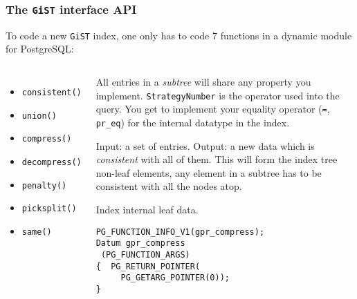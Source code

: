 \documentclass{beamer}
\begin{document}
\begin{frame}[fragile]
  \frametitle{The \texttt{GiST} interface API}

  To code a new \texttt{GiST} index, one only has to code 7 functions in a
  dynamic module for PostgreSQL:

\begin{columns}[c]

  \begin{itemize}
   \item<1,2,6-> \texttt{consistent()}
   \item<1,3,6-> \texttt{union()}
   \item<1,4,6-> \texttt{compress()}
   \item<1,4,6-> \texttt{decompress()}
   \item<1,5,6-> \texttt{penalty()}
   \item<1,5,6-> \texttt{picksplit()}
   \item<1,2,6-> \texttt{same()}
  \end{itemize}


  \begin{overprint}


  All entries in a \textit{subtree} will share any property you
  implement.
  \linebreak
  \texttt{StrategyNumber} is the operator used into the query.
  \linebreak
  \linebreak
  You get to implement your equality operator (\texttt{=},
  \texttt{pr\_eq}) for the internal datatype in the index.


  Input: a set of entries. 
  \linebreak
  \linebreak
  Output: a new data which is \textit{consistent} with all of them.
  \linebreak
  \linebreak
  This will form the index tree non-leaf elements, any element in a subtree
  has to be consistent with all the nodes atop.

  Index internal leaf data.
  \begin{example}
  \begin{verbatim}
PG_FUNCTION_INFO_V1(gpr_compress);
Datum gpr_compress
 (PG_FUNCTION_ARGS) 
{  PG_RETURN_POINTER(
     PG_GETARG_POINTER(0));
}
  \end{verbatim}
  \end{example}


\end{overprint}
\end{columns}
\end{frame}
\end{document}
